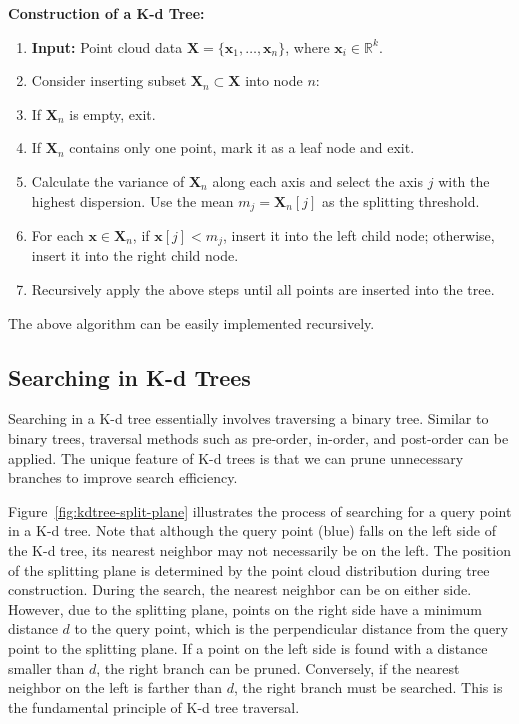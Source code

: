 \begin{mdframed}
	\textbf{Construction of a K-d Tree:}
	\begin{enumerate}
		\item \textbf{Input:} Point cloud data \(\bm{X} = \{\bm{x}_1, \ldots, \bm{x}_n\}\), where \(\bm{x}_i \in \mathbb{R}^{k}\).
		\item Consider inserting subset \(\bm{X}_n \subset \bm{X}\) into node \(n\):
		\item If \(\bm{X}_n\) is empty, exit.
		\item If \(\bm{X}_n\) contains only one point, mark it as a leaf node and exit.
		\item Calculate the variance of \(\bm{X}_n\) along each axis and select the axis \(j\) with the highest dispersion. Use the mean \(m_j = \bm{X}_n[j]\) as the splitting threshold.
		\item For each \(\bm{x} \in \bm{X}_n\), if \(\bm{x}[j] < m_j\), insert it into the left child node; otherwise, insert it into the right child node.
		\item Recursively apply the above steps until all points are inserted into the tree.
	\end{enumerate}
\end{mdframed}

The above algorithm can be easily implemented recursively.

\subsection{Searching in K-d Trees}
Searching in a K-d tree essentially involves traversing a binary tree. Similar to binary trees, traversal methods such as pre-order, in-order, and post-order can be applied. The unique feature of K-d trees is that we can prune unnecessary branches to improve search efficiency.

Figure~\ref{fig:kdtree-split-plane} illustrates the process of searching for a query point in a K-d tree. Note that although the query point (blue) falls on the left side of the K-d tree, its nearest neighbor may not necessarily be on the left. The position of the splitting plane is determined by the point cloud distribution during tree construction. During the search, the nearest neighbor can be on either side. However, due to the splitting plane, points on the right side have a minimum distance \(d\) to the query point, which is the perpendicular distance from the query point to the splitting plane. If a point on the left side is found with a distance smaller than \(d\), the right branch can be pruned. Conversely, if the nearest neighbor on the left is farther than \(d\), the right branch must be searched. This is the fundamental principle of K-d tree traversal.

